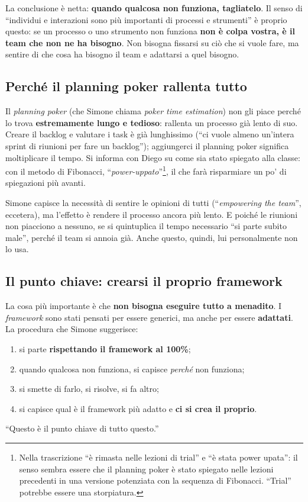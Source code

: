 La conclusione è netta: \textbf{quando qualcosa non funziona, tagliatelo}. Il
senso di ``individui e interazioni sono più importanti di processi e
strumenti'' è proprio questo: se un processo o uno strumento non funziona
\textbf{non è colpa vostra, è il team che non ne ha bisogno}. Non bisogna
fissarsi su ciò che si vuole fare, ma sentire di che cosa ha bisogno il team e
adattarsi a quel bisogno.

\subsection{Perché il planning poker rallenta tutto}

Il \emph{planning poker} (che Simone chiama \emph{poker time estimation})
non gli piace perché lo trova \textbf{estremamente lungo e tedioso}: rallenta
un processo già lento di suo. Creare il backlog e valutare i task è già
lunghissimo (``ci vuole almeno un'intera sprint di riunioni per fare un
backlog''); aggiungerci il planning poker significa moltiplicare il tempo. Si
informa con Diego su come sia stato spiegato alla classe: con il metodo di
Fibonacci, ``\emph{power-uppato}''\footnote{Nella trascrizione ``è rimasta
nelle lezioni di trial'' e ``è stata power upata'': il senso sembra essere che
il planning poker è stato spiegato nelle lezioni precedenti in una versione
potenziata con la sequenza di Fibonacci. ``Trial'' potrebbe essere una
storpiatura.}, il che farà risparmiare un po' di spiegazioni più avanti.

Simone capisce la necessità di sentire le opinioni di tutti
(``\emph{empowering the team}'', eccetera), ma l'effetto è rendere il processo
ancora più lento. E poiché le riunioni non piacciono a nessuno, se si
quintuplica il tempo necessario ``si parte subito male'', perché il team si
annoia già. Anche questo, quindi, lui personalmente non lo usa.

\subsection{Il punto chiave: crearsi il proprio framework}

La cosa più importante è che \textbf{non bisogna eseguire tutto a menadito}.
I \emph{framework} sono stati pensati per essere generici, ma anche per
essere \textbf{adattati}. La procedura che Simone suggerisce:
\begin{enumerate}
  \item si parte \textbf{rispettando il framework al 100\%};
  \item quando qualcosa non funziona, si capisce \emph{perché} non funziona;
  \item si smette di farlo, si risolve, si fa altro;
  \item si capisce qual è il framework più adatto e \textbf{ci si crea il
        proprio}.
\end{enumerate}
``Questo è il punto chiave di tutto questo.''

